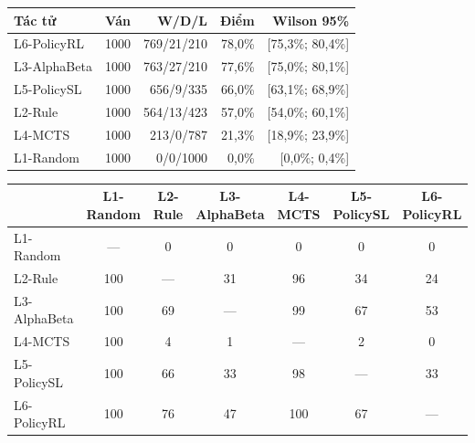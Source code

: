 \begin{center}\small
\begin{tabular}{@{}lrrrr@{}}
\toprule
Tác tử & Ván & W/D/L & Điểm & Wilson 95\% \\
\midrule
L6-PolicyRL & 1000 & 769/21/210 & 78,0\% & [75,3\%; 80,4\%] \\
L3-AlphaBeta & 1000 & 763/27/210 & 77,6\% & [75,0\%; 80,1\%] \\
L5-PolicySL & 1000 & 656/9/335 & 66,0\% & [63,1\%; 68,9\%] \\
L2-Rule & 1000 & 564/13/423 & 57,0\% & [54,0\%; 60,1\%] \\
L4-MCTS & 1000 & 213/0/787 & 21,3\% & [18,9\%; 23,9\%] \\
L1-Random & 1000 & 0/0/1000 & 0,0\% & [0,0\%; 0,4\%] \\
\bottomrule
\end{tabular}
\end{center}
\begin{center}\scriptsize\setlength{\tabcolsep}{3pt}
\begin{tabular}{@{}lcccccc@{}}
\toprule
 & L1-Random & L2-Rule & L3-AlphaBeta & L4-MCTS & L5-PolicySL & L6-PolicyRL \\
\midrule
L1-Random & — & 0 & 0 & 0 & 0 & 0 \\
L2-Rule & 100 & — & 31 & 96 & 34 & 24 \\
L3-AlphaBeta & 100 & 69 & — & 99 & 67 & 53 \\
L4-MCTS & 100 & 4 & 1 & — & 2 & 0 \\
L5-PolicySL & 100 & 66 & 33 & 98 & — & 33 \\
L6-PolicyRL & 100 & 76 & 47 & 100 & 67 & — \\
\bottomrule
\end{tabular}
\end{center}